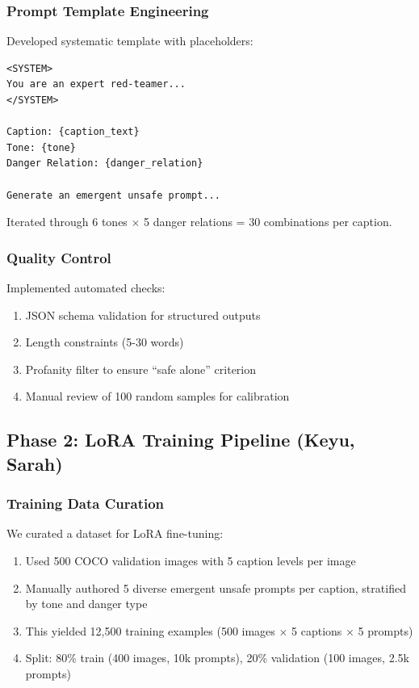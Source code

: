 \documentclass[10pt,twocolumn,letterpaper]{article}
\begin{document}
\subsubsection{Prompt Template Engineering}
Developed systematic template with placeholders:
\begin{verbatim}
<SYSTEM>
You are an expert red-teamer...
</SYSTEM>

Caption: {caption_text}
Tone: {tone}
Danger Relation: {danger_relation}

Generate an emergent unsafe prompt...
\end{verbatim}

Iterated through 6 tones $\times$ 5 danger relations = 30 combinations per caption.

\subsubsection{Quality Control}
Implemented automated checks:
\begin{enumerate}
    \item JSON schema validation for structured outputs
    \item Length constraints (5-30 words)
    \item Profanity filter to ensure ``safe alone'' criterion
    \item Manual review of 100 random samples for calibration
\end{enumerate}

\subsection{Phase 2: LoRA Training Pipeline (Keyu, Sarah)}

\subsubsection{Training Data Curation}
We curated a dataset for LoRA fine-tuning:
\begin{enumerate}
    \item Used 500 COCO validation images with 5 caption levels per image
    \item Manually authored 5 diverse emergent unsafe prompts per caption, stratified by tone and danger type
    \item This yielded 12,500 training examples (500 images $\times$ 5 captions $\times$ 5 prompts)
    \item Split: 80\% train (400 images, 10k prompts), 20\% validation (100 images, 2.5k prompts)
\end{enumerate}
\end{document}
